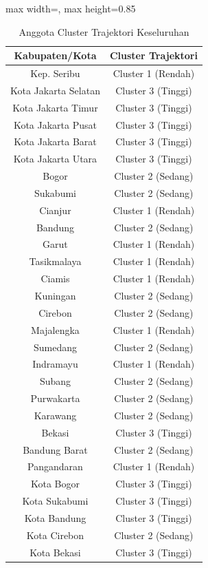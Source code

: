 \begin{table}[H]
\centering
\caption{Anggota Cluster Trajektori Keseluruhan} \label{tab:app2clustermembers}
\begin{adjustbox}{max width=\textwidth, max height=0.85\textheight}
\begin{tabular}{|c|c|}
\hline
\textbf{Kabupaten/Kota} & \textbf{Cluster Trajektori} \\
\hline
Kep. Seribu & Cluster 1 (Rendah) \\
Kota Jakarta Selatan & Cluster 3 (Tinggi) \\
Kota Jakarta Timur & Cluster 3 (Tinggi) \\
Kota Jakarta Pusat & Cluster 3 (Tinggi) \\
Kota Jakarta Barat & Cluster 3 (Tinggi) \\
Kota Jakarta Utara & Cluster 3 (Tinggi) \\
Bogor & Cluster 2 (Sedang) \\
Sukabumi & Cluster 2 (Sedang) \\
Cianjur & Cluster 1 (Rendah) \\
Bandung & Cluster 2 (Sedang) \\
Garut & Cluster 1 (Rendah) \\
Tasikmalaya & Cluster 1 (Rendah) \\
Ciamis & Cluster 1 (Rendah) \\
Kuningan & Cluster 2 (Sedang) \\
Cirebon & Cluster 2 (Sedang) \\
Majalengka & Cluster 1 (Rendah) \\
Sumedang & Cluster 2 (Sedang) \\
Indramayu & Cluster 1 (Rendah) \\
Subang & Cluster 2 (Sedang) \\
Purwakarta & Cluster 2 (Sedang) \\
Karawang & Cluster 2 (Sedang) \\
Bekasi & Cluster 3 (Tinggi) \\
Bandung Barat & Cluster 2 (Sedang) \\
Pangandaran & Cluster 1 (Rendah) \\
Kota Bogor & Cluster 3 (Tinggi) \\
Kota Sukabumi & Cluster 3 (Tinggi) \\
Kota Bandung & Cluster 3 (Tinggi) \\
Kota Cirebon & Cluster 2 (Sedang) \\
Kota Bekasi & Cluster 3 (Tinggi) \\

\end{tabular}
\end{adjustbox}
\end{table}
